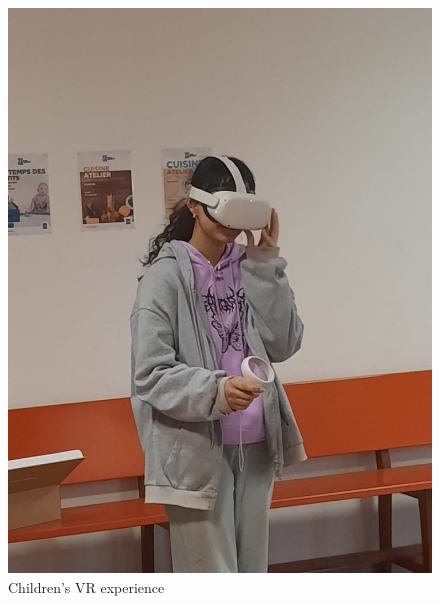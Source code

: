 \begin{figure}[htp]
\begin{minipage}[c]{0.5\textwidth}
        \includegraphics[width=4\textwidth, height=0.3\textheight,keepaspectratio]{Figures/yasmina.jpg}
        \caption{Children's VR experience}
    \end{minipage}
\end{figure}
\\


